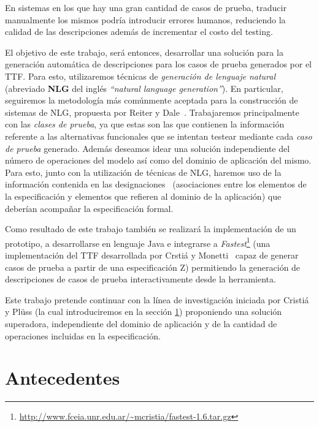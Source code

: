 En sistemas en los que hay una gran cantidad de casos de prueba, traducir manualmente los mismos podría introducir errores humanos, reduciendo la calidad de las descripciones además de incrementar el costo del testing.

El objetivo de este trabajo, será entonces, desarrollar una solución para la generación automática de descripciones para los casos de prueba generados por el TTF. Para esto, utilizaremos técnicas de \emph{generación de lenguaje natural} (abreviado \textbf{NLG} del inglés  \emph{``natural language generation''}). En particular, seguiremos la metodología más comúnmente aceptada para la construcción de sistemas de NLG, propuesta por Reiter y Dale~\cite{reiter_dale}. Trabajaremos principalmente con las \emph{clases de prueba}, ya que estas son las que contienen la información referente a las alternativas funcionales que se intentan testear mediante cada \emph{caso de prueba} generado. Además deseamos idear una solución independiente del número de operaciones del modelo así como del dominio de aplicación del mismo. Para esto, junto con la utilización de técnicas de NLG, haremos uso de la información contenida en las designaciones~\cite{jackson} (asociaciones entre los elementos de la especificación y elementos que refieren al dominio de la aplicación) que deberían acompañar la especificación formal. 


Como resultado de este trabajo también se realizará la implementación de un prototipo, a desarrollarse en lenguaje Java e integrarse a \emph{Fastest}\footnote{\url{http://www.fceia.unr.edu.ar/~mcristia/fastest-1.6.tar.gz}} (una implementación del TTF desarrollada por Crstiá y Monetti~\cite{fastest1} capaz de generar casos de prueba a partir de una especificación Z) permitiendo la generación de descripciones de casos de prueba interactivamente desde la herramienta. 


Este trabajo pretende continuar con la línea de investigación iniciada por Cristiá y Plüss \cite{cristia_pluss} (la cual introduciremos en la sección \ref{sec:antecedentes}) proponiendo una solución superadora, independiente del dominio de aplicación y de la cantidad de operaciones incluidas en la especificación.

\section{Antecedentes}
\label{sec:antecedentes}

